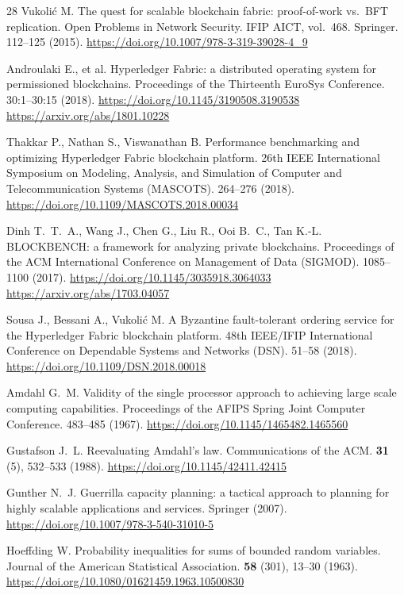 \begin{thebibliography}{28}
Vukoli\'{c} M. The quest for scalable blockchain fabric: proof-of-work vs.\ BFT
replication. Open Problems in Network Security. IFIP AICT, vol.~468. Springer.
112--125 (2015).
\url{https://doi.org/10.1007/978-3-319-39028-4_9}

Androulaki E., et al. Hyperledger Fabric: a distributed operating system for
permissioned blockchains. Proceedings of the Thirteenth EuroSys Conference.
30:1--30:15 (2018).
\url{https://doi.org/10.1145/3190508.3190538}
\url{https://arxiv.org/abs/1801.10228}

Thakkar P., Nathan S., Viswanathan B. Performance benchmarking and optimizing
Hyperledger Fabric blockchain platform. 26th IEEE International Symposium on
Modeling, Analysis, and Simulation of Computer and Telecommunication Systems
(MASCOTS). 264--276 (2018).
\url{https://doi.org/10.1109/MASCOTS.2018.00034}

Dinh T.~T.~A., Wang J., Chen G., Liu R., Ooi B.~C., Tan K.-L. BLOCKBENCH: a
framework for analyzing private blockchains. Proceedings of the ACM
International Conference on Management of Data (SIGMOD). 1085--1100 (2017).
\url{https://doi.org/10.1145/3035918.3064033}
\url{https://arxiv.org/abs/1703.04057}

Sousa J., Bessani A., Vukoli\'{c} M. A Byzantine fault-tolerant ordering service
for the Hyperledger Fabric blockchain platform. 48th IEEE/IFIP International
Conference on Dependable Systems and Networks (DSN). 51--58 (2018).
\url{https://doi.org/10.1109/DSN.2018.00018}

Amdahl G.~M. Validity of the single processor approach to achieving large scale
computing capabilities. Proceedings of the AFIPS Spring Joint Computer
Conference. 483--485 (1967).
\url{https://doi.org/10.1145/1465482.1465560}

Gustafson J.~L. Reevaluating Amdahl's law. Communications of the ACM.
\textbf{31} (5), 532--533 (1988).
\url{https://doi.org/10.1145/42411.42415}

Gunther N.~J. Guerrilla capacity planning: a tactical approach to planning for
highly scalable applications and services. Springer (2007).
\url{https://doi.org/10.1007/978-3-540-31010-5}

Hoeffding W. Probability inequalities for sums of bounded random variables.
Journal of the American Statistical Association. \textbf{58} (301), 13--30
(1963).
\url{https://doi.org/10.1080/01621459.1963.10500830}


\end{thebibliography}

